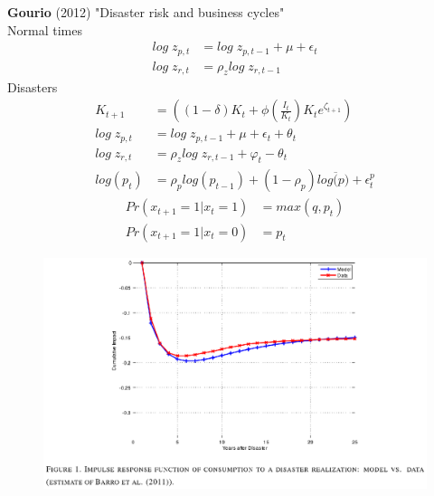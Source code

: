 \documentclass{beamer}
\begin{document}
\begin{frame}
 \textbf{Gourio} (2012) "Disaster risk and business cycles"\\
 \medskip
 Normal times
 \begin{align}
   log\;z_{p,t}&= log\; z_{p,t-1} + \mu + \epsilon_t \\
   log\; z_{r,t} &= \rho_z log\; z_{r,t-1}
 \end{align}
 \medskip
 Disasters
  \begin{align}
    K_{t+1} &= \left( (1-\delta)K_t + \phi \left(\frac{I_t}{K_t}\right)K_t e^{\zeta_{t+1}} \right)\\
    log\;z_{p,t}&= log\; z_{p,t-1} + \mu + \epsilon_t + \theta_t \\
    log\; z_{r,t} &= \rho_z log\; z_{r,t-1} +\varphi_t - \theta_t\\
    log(p_t) &= \rho_p log(p_{t-1}) + (1-\rho_p)log\overline(p)+\epsilon_t^p
  \end{align}
  \begin{align}
   Pr(x_{t+1}=1 | x_t=1) &= max(q,p_t)\\
   Pr(x_{t+1}=1 | x_t=0) &= p_t
 \end{align}
\end{frame}

\begin{frame}
  \begin{figure}
    \includegraphics[scale=.8]{gourio1.eps}
  \end{figure}
\end{frame}
\end{document}
